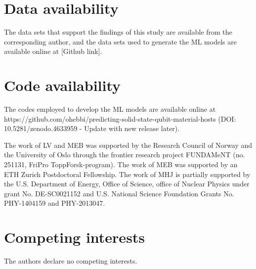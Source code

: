 \documentclass[superscriptaddress,unsortedaddress,
 amsmath,amssymb,
 aps,
]{revtex4-2}
\begin{document}
\section*{Data availability} 

The data sets that support the findings of this study are available from the corresponding author, and the data sets used to generate the ML models are available online at [Github link]. 

\section*{Code availability} 
The codes employed to develop the ML models are available online at https://github.com/ohebbi/predicting-solid-state-qubit-material-hosts (DOI: 10.5281/zenodo.4633959 - Update with new release later). %


\begin{acknowledgments}

The work of LV and MEB was supported by the Research Council of Norway and the University of Oslo through the frontier research project FUNDAMeNT (no. 251131, FriPro ToppForsk-program). 
The work of MEB was supported by an ETH Zurich Postdoctoral Fellowship. 
The work of MHJ is partially supported by the U.S. Department of Energy,
Office of Science, office of Nuclear Physics under grant
No. DE-SC0021152 and U.S. National Science Foundation Grants
No. PHY-1404159 and PHY-2013047. 


\end{acknowledgments}


\section*{Competing interests}
The authors declare no competing interests.
\end{document}
